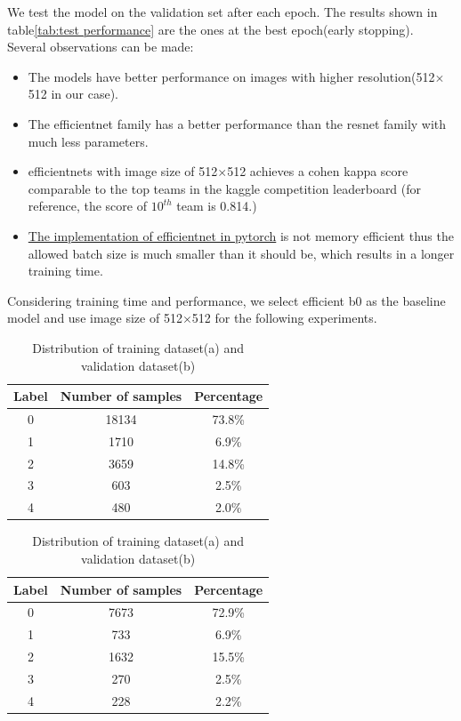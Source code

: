 \documentclass[../main.tex]{subfiles}
\begin{document}
We test the model on the validation set after each epoch. The results shown in table\ref{tab:test performance} are the ones at the best epoch(early stopping). Several observations can be made:
\begin{itemize}
  \item The models have better performance on images with higher resolution(512$\times$512 in our case).
  \item The efficientnet family has a better performance than the resnet family with much less parameters.
  \item efficientnets with image size of 512$\times$512 achieves a cohen kappa score comparable to the top teams in the kaggle competition leaderboard (for reference, the score of $10^{th}$ team is 0.814.)
  \item \href{https://github.com/lukemelas/EfficientNet-PyTorch}{The implementation of efficientnet in pytorch} is not memory efficient thus the allowed batch size is much smaller than it should be, which results in a longer training time. 
\end{itemize}
Considering training time and performance, we select efficient b0 as the baseline model and use image size of 512$\times$512 for the following experiments. 

\begin{table}[!htb]
    \linespread{1.5}
\renewcommand\arraystretch{1.25}
    \begin{subtable}{.5\linewidth}
      \centering
\begin{tabular}{|c|c|c|}
  \hline
    Label & Number of samples & Percentage\\
  \hline
    0 & 18134 & 73.8\% \\
    \hline
    1 & 1710 & 6.9\%\\
    \hline
    2 & 3659 & 14.8\%\\
    \hline
    3 & 603 & 2.5\%\\
    \hline
    4 & 480 & 2.0\% \\
    \hline
\end{tabular}
    \caption{}
    \end{subtable}%
    \begin{subtable}{.5\linewidth}
      \centering
\begin{tabular}{|c|c|c|}
  \hline
    Label & Number of samples & Percentage\\
  \hline
    0 & 7673 & 72.9\% \\
    \hline
    1 & 733 & 6.9\%\\
    \hline
    2 & 1632 & 15.5\%\\
    \hline
    3 & 270 & 2.5\%\\
    \hline
    4 & 228 & 2.2\% \\
    \hline
\end{tabular}
    \caption{}
    \end{subtable} 
        \caption{Distribution of training dataset(a) and validation dataset(b)}
        \label{tab:training_dist}
\end{table}
\end{document}
